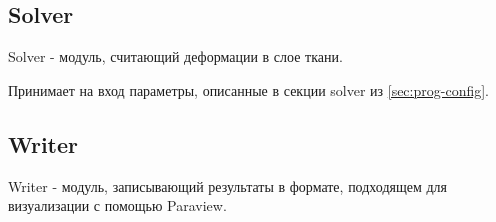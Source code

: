 \subsection{Solver}\label{sec:prog-solver}
Solver - модуль, считающий деформации в слое ткани.

Принимает на вход параметры, описанные в секции solver из \ref{sec:prog-config}.

\subsection{Writer}\label{sec:prog-writer}
Writer - модуль, записывающий результаты в формате, подходящем для визуализации с помощью Paraview.
